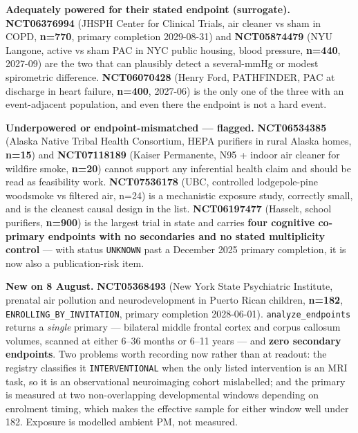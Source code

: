 \documentclass[10pt]{article}
\begin{document}
\vspace{1.5mm}
\textbf{Adequately powered for their stated endpoint (surrogate).}
\textbf{NCT06376994} (JHSPH Center for Clinical Trials, air cleaner vs sham in COPD,
\textbf{n=770}, primary completion 2029-08-31) and \textbf{NCT05874479} (NYU Langone,
active vs sham PAC in NYC public housing, blood pressure, \textbf{n=440}, 2027-09) are the
two that can plausibly detect a several-mmHg or modest spirometric difference.
\textbf{NCT06070428} (Henry Ford, PATHFINDER, PAC at discharge in heart failure,
\textbf{n=400}, 2027-06) is the only one of the three with an event-adjacent population,
and even there the endpoint is not a hard event.

\vspace{1.5mm}
\textbf{Underpowered or endpoint-mismatched --- flagged.} \textbf{NCT06534385}
(Alaska Native Tribal Health Consortium, HEPA purifiers in rural Alaska homes,
\textbf{n=15}) and \textbf{NCT07118189} (Kaiser Permanente, N95 + indoor air cleaner for
wildfire smoke, \textbf{n=20}) cannot support any inferential health claim and should be
read as feasibility work. \textbf{NCT07536178} (UBC, controlled lodgepole-pine woodsmoke
vs filtered air, n=24) is a mechanistic exposure study, correctly small, and is the
cleanest causal design in the list. \textbf{NCT06197477} (Hasselt, school purifiers,
\textbf{n=900}) is the largest trial in state and carries \textbf{four cognitive
co-primary endpoints with no secondaries and no stated multiplicity control} --- with
status \texttt{UNKNOWN} past a December 2025 primary completion, it is now also a
publication-risk item.

\vspace{1.5mm}
\textbf{New on 8 August.} \textbf{NCT05368493} (New York State Psychiatric Institute,
prenatal air pollution and neurodevelopment in Puerto Rican children,
\textbf{n=182}, \texttt{ENROLLING\_BY\_INVITATION}, primary completion 2028-06-01).
\texttt{analyze\_endpoints} returns a \emph{single} primary --- bilateral middle frontal
cortex and corpus callosum volumes, scanned at either 6--36 months or 6--11 years --- and
\textbf{zero secondary endpoints}. Two problems worth recording now rather than at
readout: the registry classifies it \texttt{INTERVENTIONAL} when the only listed
intervention is an MRI task, so it is an observational neuroimaging cohort mislabelled;
and the primary is measured at two non-overlapping developmental windows depending on
enrolment timing, which makes the effective sample for either window well under 182.
Exposure is modelled ambient PM, not measured.
\end{document}
